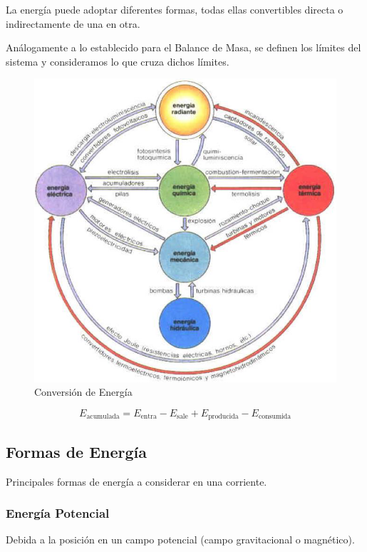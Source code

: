 La energía puede adoptar diferentes formas, todas ellas convertibles directa o indirectamente de una en otra.

Análogamente a lo establecido para el Balance de Masa, se definen los límites del sistema y consideramos lo que cruza dichos límites.

\begin{figure}
    \centering
    \includegraphics[width=.8\textwidth]{img/diagramas/balance_energia.png}
    \caption[Conversión de Energía]{Conversión de Energía \cite{martinez_salas_transformacion_2013}}
    \label{fig:balance_energia}
\end{figure}

\begin{equation}
\label{eq:balance_energia}
    E_{\text{acumulada}} = E_{\text{entra}} - E_{\text{sale}} + E_{\text{producida}} - E_{\text{consumida}}
\end{equation}

    \subsection{Formas de Energía}
    
    Principales formas de energía a considerar en una corriente.
    
        \subsubsection{Energía Potencial}
        
        Debida a la posición en un campo potencial (campo gravitacional o magnético).
        
